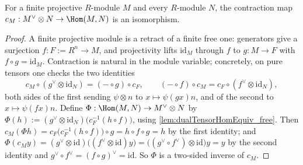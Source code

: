 \begin{theorem}
  \label{thm:dualTensorHom_projective}
  \leanok
  For a finite projective \(R\)-module \(M\) and every \(R\)-module \(N\), the
  contraction map \(c_M : M^{\vee} \otimes N \to \Hom(M, N)\) is an isomorphism.
\end{theorem}
\begin{proof}
  \leanok
  A finite projective module is a retract of a finite free one: generators give a
  surjection \(f : F := R^n \to M\), and projectivity lifts \(\mathrm{id}_M\) through
  \(f\) to \(g : M \to F\) with \(f \circ g = \mathrm{id}_M\). Contraction is natural in
  the module variable; concretely, on pure tensors one checks the two identities
  \[
    c_M \circ (g^{\vee} \otimes \mathrm{id}_N) = (- \circ g) \circ c_F,
    \qquad
    (- \circ f) \circ c_M = c_F \circ (f^{\vee} \otimes \mathrm{id}_N),
  \]
  both sides of the first sending \(\psi \otimes n\) to \(x \mapsto \psi(g x) n\), and
  of the second to \(x \mapsto \psi(f x) n\). Define
  \(\Phi : \Hom(M, N) \to M^{\vee} \otimes N\) by
  \(\Phi(h) := (g^{\vee} \otimes \mathrm{id}_N)\bigl(c_F^{-1}(h \circ f)\bigr)\), using
  \ref{lem:dualTensorHomEquiv_free}. Then
  \(c_M(\Phi h) = c_F\bigl(c_F^{-1}(h \circ f)\bigr) \circ g = h \circ f \circ g = h\)
  by the first identity; and
  \(\Phi(c_M y) = (g^{\vee} \otimes \mathrm{id})\bigl((f^{\vee} \otimes \mathrm{id})
  y\bigr) = \bigl((g^{\vee} \circ f^{\vee}) \otimes \mathrm{id}\bigr) y = y\) by the
  second identity and \(g^{\vee} \circ f^{\vee} = (f \circ g)^{\vee} =
  \mathrm{id}\). So \(\Phi\) is a two-sided inverse of \(c_M\).
\end{proof}

